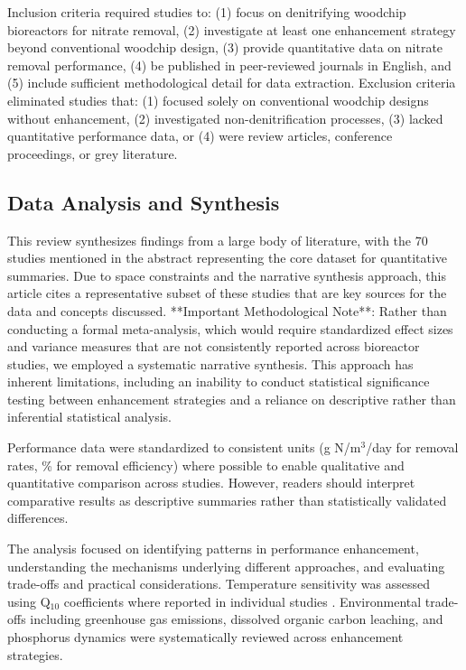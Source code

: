 \documentclass[12pt,a4paper]{article}
\begin{document}
Inclusion criteria required studies to: (1) focus on denitrifying woodchip bioreactors for nitrate removal, (2) investigate at least one enhancement strategy beyond conventional woodchip design, (3) provide quantitative data on nitrate removal performance, (4) be published in peer-reviewed journals in English, and (5) include sufficient methodological detail for data extraction. Exclusion criteria eliminated studies that: (1) focused solely on conventional woodchip designs without enhancement, (2) investigated non-denitrification processes, (3) lacked quantitative performance data, or (4) were review articles, conference proceedings, or grey literature.

\subsection{Data Analysis and Synthesis}

This review synthesizes findings from a large body of literature, with the 70 studies mentioned in the abstract representing the core dataset for quantitative summaries. Due to space constraints and the narrative synthesis approach, this article cites a representative subset of these studies that are key sources for the data and concepts discussed. **Important Methodological Note**: Rather than conducting a formal meta-analysis, which would require standardized effect sizes and variance measures that are not consistently reported across bioreactor studies, we employed a systematic narrative synthesis. This approach has inherent limitations, including an inability to conduct statistical significance testing between enhancement strategies and a reliance on descriptive rather than inferential statistical analysis.

Performance data were standardized to consistent units (g N/m$^3$/day for removal rates, \% for removal efficiency) where possible to enable qualitative and quantitative comparison across studies. However, readers should interpret comparative results as descriptive summaries rather than statistically validated differences.

The analysis focused on identifying patterns in performance enhancement, understanding the mechanisms underlying different approaches, and evaluating trade-offs and practical considerations. Temperature sensitivity was assessed using Q$_{10}$ coefficients where reported in individual studies \citep{RN242, RN258}. Environmental trade-offs including greenhouse gas emissions, dissolved organic carbon leaching, and phosphorus dynamics were systematically reviewed across enhancement strategies.
\end{document}
